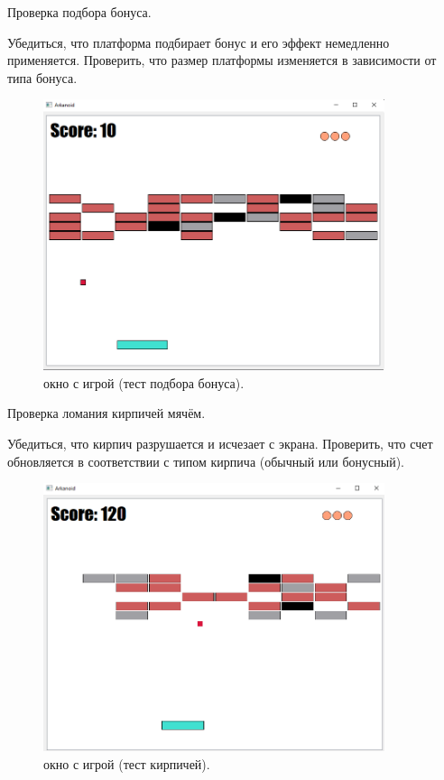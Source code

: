 Проверка подбора бонуса. 

Убедиться, что платформа подбирает бонус и его эффект немедленно применяется.
Проверить, что размер платформы изменяется в зависимости от типа бонуса.

\begin{figure} [h!]
  \centering
  \graphicspath{ {img/} }
  \includegraphics[width=10cm]{image/7.png}
  \caption{окно с игрой (тест подбора бонуса). }
  \label{fig:image}
\end{figure}


Проверка ломания кирпичей мячём.

Убедиться, что кирпич разрушается и исчезает с экрана. Проверить, что счет обновляется в соответствии с типом кирпича (обычный или бонусный).

\begin{figure} [h!]
  \centering
  \graphicspath{ {img/} }
  \includegraphics[width=10cm]{image/4.png}
  \caption{окно с игрой (тест кирпичей). }
  \label{fig:image}
\end{figure}
